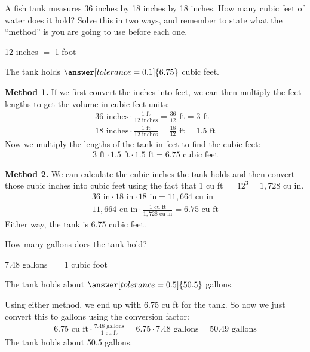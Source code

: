 \documentclass[12pt]{ximera}
\begin{document}
\begin{problem}
A fish tank measures 36 inches by 18 inches by 18 inches. How many cubic feet of water
does it hold? Solve this in two ways, and remember to state what the ``method'' is you
are going to use before each one.

\hspace{1em} 12 inches $=$ 1 foot

The tank holds $\answer[tolerance=0.1]{6.75}$ cubic feet.

\begin{freeResponse}
\end{freeResponse}

\begin{solution}
\textbf{Method 1.} If we first convert the inches into feet, we can then multiply the
feet lengths to get the volume in cubic feet units:
\begin{gather*}
36\text{ inches} \cdot \frac{1\text{ ft}}{12\text{ inches}} = \frac{36}{12}\text{ ft} = 3\text{ ft} \\
18\text{ inches} \cdot \frac{1\text{ ft}}{12\text{ inches}} = \frac{18}{12}\text{ ft} = 1.5\text{ ft}
\end{gather*}
Now we multiply the lengths of the tank in feet to find the cubic feet:
\begin{gather*}
3\text{ ft} \cdot 1.5\text{ ft} \cdot 1.5\text{ ft} = 6.75\text{ cubic feet}
\end{gather*}

\textbf{Method 2.} We can calculate the cubic inches the tank holds and then convert
those cubic inches into cubic feet using the fact that 1 cu ft $= 12^{3} = 1{,}728$ cu
in.
\begin{gather*}
36\text{ in} \cdot 18\text{ in} \cdot 18\text{ in} = 11{,}664\text{ cu in} \\
11{,}664\text{ cu in} \cdot \frac{1\text{ cu ft}}{1{,}728\text{ cu in}} = 6.75\text{ cu ft}
\end{gather*}
Either way, the tank is 6.75 cubic feet.
\end{solution}
\end{problem}

\begin{problem}
How many gallons does the tank hold?

\hspace{1em} 7.48 gallons $=$ 1 cubic foot

The tank holds about $\answer[tolerance=0.5]{50.5}$ gallons.

\begin{solution}
Using either method, we end up with 6.75 cu ft for the tank. So now we just convert
this to gallons using the conversion factor:
\begin{gather*}
6.75\text{ cu ft} \cdot \frac{7.48\text{ gallons}}{1\text{ cu ft}} = 6.75 \cdot 7.48\text{ gallons} = 50.49\text{ gallons}
\end{gather*}
The tank holds about 50.5 gallons.
\end{solution}
\end{problem}
\end{document}
